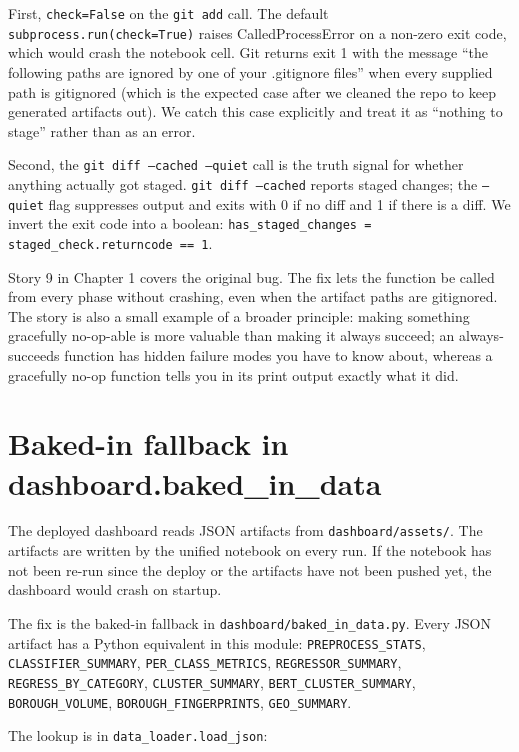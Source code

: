 \documentclass[11pt,letterpaper]{book}
\begin{document}
First, \texttt{check=False} on the \texttt{git add} call. The default \texttt{subprocess.run(check=True)} raises CalledProcessError on a non-zero exit code, which would crash the notebook cell. Git returns exit 1 with the message ``the following paths are ignored by one of your .gitignore files'' when every supplied path is gitignored (which is the expected case after we cleaned the repo to keep generated artifacts out). We catch this case explicitly and treat it as ``nothing to stage'' rather than as an error.

Second, the \texttt{git diff --cached --quiet} call is the truth signal for whether anything actually got staged. \texttt{git diff --cached} reports staged changes; the \texttt{--quiet} flag suppresses output and exits with 0 if no diff and 1 if there is a diff. We invert the exit code into a boolean: \texttt{has\_staged\_changes = staged\_check.returncode == 1}.

Story 9 in Chapter 1 covers the original bug. The fix lets the function be called from every phase without crashing, even when the artifact paths are gitignored. The story is also a small example of a broader principle: making something gracefully no-op-able is more valuable than making it always succeed; an always-succeeds function has hidden failure modes you have to know about, whereas a gracefully no-op function tells you in its print output exactly what it did.

\section{Baked-in fallback in dashboard.baked\_in\_data}

The deployed dashboard reads JSON artifacts from \texttt{dashboard/assets/}. The artifacts are written by the unified notebook on every run. If the notebook has not been re-run since the deploy or the artifacts have not been pushed yet, the dashboard would crash on startup.

The fix is the baked-in fallback in \texttt{dashboard/baked\_in\_data.py}. Every JSON artifact has a Python equivalent in this module: \texttt{PREPROCESS\_STATS}, \texttt{CLASSIFIER\_SUMMARY}, \texttt{PER\_CLASS\_METRICS}, \texttt{REGRESSOR\_SUMMARY}, \texttt{REGRESS\_BY\_CATEGORY}, \texttt{CLUSTER\_SUMMARY}, \texttt{BERT\_CLUSTER\_SUMMARY}, \texttt{BOROUGH\_VOLUME}, \texttt{BOROUGH\_FINGERPRINTS}, \texttt{GEO\_SUMMARY}.

The lookup is in \texttt{data\_loader.load\_json}:
\end{document}

